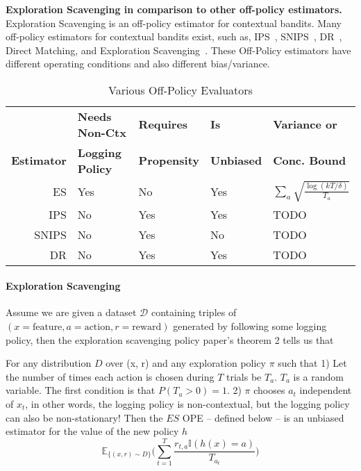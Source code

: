 \documentclass[preview,border={30 30 30 30}]{standalone}
\begin{document}
\textbf{Exploration Scavenging in comparison to other off-policy estimators.}~\\

Exploration Scavenging is an off-policy estimator for contextual bandits.
Many off-policy estimators for contextual bandits exist, such as,
IPS~\cite{rosenbaum1983central},
SNIPS~\cite{swaminathan2015self},
DR~\cite{dudik2014doubly}, Direct Matching, and
Exploration Scavenging~\cite{langford2008exploration}. These Off-Policy estimators have different operating conditions and also different bias/variance.

\begin{table}[htbp]
  \centering
  \caption{Various Off-Policy Evaluators}
  \begin{tabular}{rllll}
    \toprule
                       & \textbf{Needs Non-Ctx}  & \textbf{Requires}   & \textbf{Is }      & \textbf{Variance or} \\
    \textbf{Estimator} & \textbf{Logging Policy} & \textbf{Propensity} & \textbf{Unbiased} & \textbf{Conc. Bound} \\
    \midrule
    ES                 & Yes                     & No                  & Yes               & $\sum_a \sqrt{\frac{ \log (kT/\delta)}{T_a}}$              \\
    IPS                & No                      & Yes                 & Yes               & TODO              \\
    SNIPS              & No                      & Yes                 & No                & TODO              \\
    DR                 & No                      & Yes                 & Yes               & TODO              \\
    \bottomrule
  \end{tabular}
  \label{tab:ope}
\end{table}


\paragraph{Exploration Scavenging} Assume we are given a dataset $\mathcal{D}$ containing
triples of $(x=\text{feature}, a=\text{action}, r=\text{reward})$ generated by following
some logging policy, then the exploration scavenging policy paper's theorem 2 tells us that

For any distribution $D$ over (x, r) and any exploration policy $\pi$ such that
1) Let the number of times each action is
chosen during $T$ trials be $T_a$. $T_a$  is a random variable.  The first condition is
that $P(T_a > 0) = 1$. 2) $\pi$ chooses $a_t$ independent of $x_t$, in other words, the
logging policy is non-contextual, but the logging policy can also be non-stationary!
Then the $ES$ OPE -- defined below -- is an unbiased estimator for the value of the new policy $h$
\[ \mathbb{E}_{\{(x,r) \sim D\}}\big( \sum_{t=1}^{T} \frac{r_{t,a} \mathbb{I}(h(x) = a)}{T_{a_t}}
  \big)
\]
\end{document}
